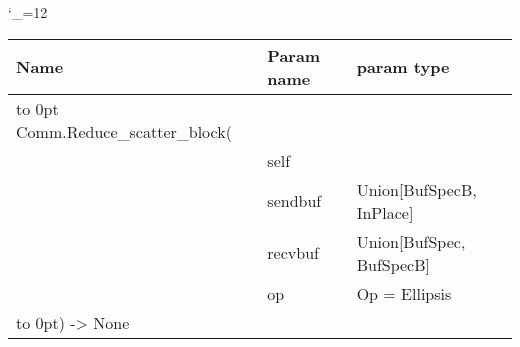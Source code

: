 \begingroup \catcode`\_=12 \tt
\begin{tabular}{lll}
\toprule
\textrm{Name}&\textrm{Param name}&\textrm{param type}\\
\midrule
\hbox to 0pt {Comm.Reduce_scatter_block(\hss}\\
& self\\
& sendbuf & Union[BufSpecB, InPlace]\\
& recvbuf & Union[BufSpec, BufSpecB]\\
& op & Op = Ellipsis\\
\hbox to 0pt{) -> None\hss}\\
\bottomrule
\end{tabular}
\endgroup
